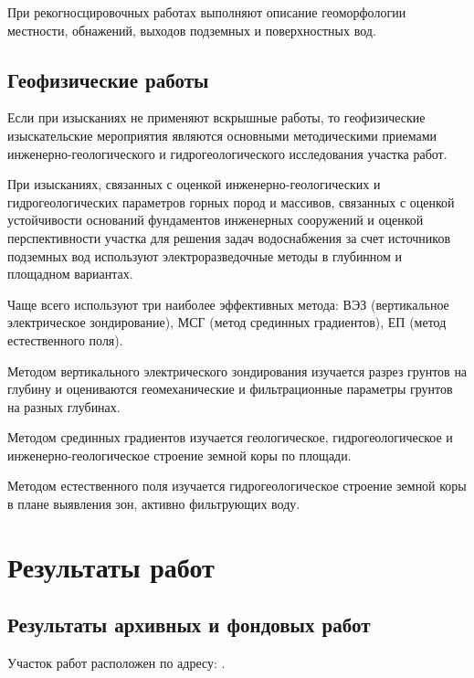 При рекогносцировочных работах выполняют описание геоморфологии местности, обнажений, выходов подземных и поверхностных вод.

\subsection{Геофизические работы}
Если при изысканиях не применяют вскрышные работы, то геофизические изыскательские мероприятия являются основными методическими приемами инженерно-геологического и гидрогеологического исследования участка работ.

При изысканиях, связанных с оценкой инженерно-геологических и гидрогеологических параметров горных пород и массивов, связанных с оценкой устойчивости оснований фундаментов инженерных сооружений и оценкой перспективности участка для решения задач водоснабжения за счет источников подземных вод используют электроразведочные методы в глубинном и площадном вариантах.

Чаще всего используют три наиболее эффективных метода:  ВЭЗ (вертикальное электрическое зондирование), МСГ (метод срединных градиентов), ЕП (метод естественного поля).

Методом вертикального электрического зондирования изучается разрез грунтов на глубину и оцениваются геомеханические и фильтрационные параметры грунтов на разных глубинах.

Методом срединных градиентов изучается геологическое, гидрогеологическое и инженерно-геологическое строение земной коры по площади.

Методом естественного поля изучается гидрогеологическое строение земной коры в плане выявления зон, активно фильтрующих воду.

\section{Результаты работ}
\subsection{Результаты архивных и фондовых работ}
Участок работ расположен по адресу: \txtAddress.

